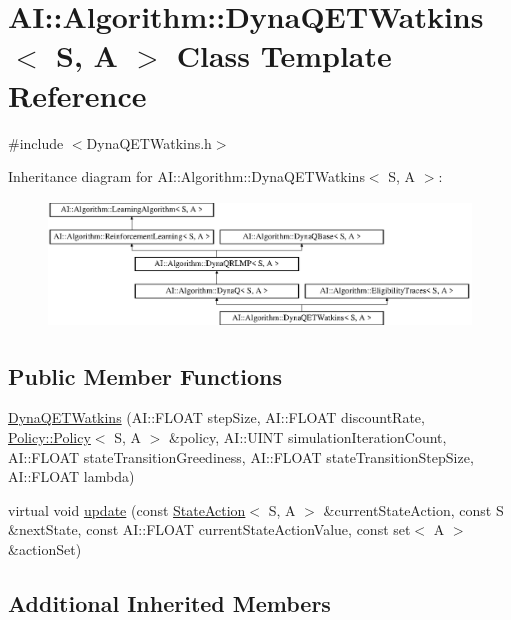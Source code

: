 \hypertarget{classAI_1_1Algorithm_1_1DynaQETWatkins}{\section{A\-I\-:\-:Algorithm\-:\-:Dyna\-Q\-E\-T\-Watkins$<$ S, A $>$ Class Template Reference}
\label{classAI_1_1Algorithm_1_1DynaQETWatkins}
}


{\ttfamily \#include $<$Dyna\-Q\-E\-T\-Watkins.\-h$>$}

Inheritance diagram for A\-I\-:\-:Algorithm\-:\-:Dyna\-Q\-E\-T\-Watkins$<$ S, A $>$\-:\begin{figure}[H]
\begin{center}
\leavevmode
\includegraphics[height=3.357314cm]{classAI_1_1Algorithm_1_1DynaQETWatkins}
\end{center}
\end{figure}
\subsection*{Public Member Functions}
\begin{DoxyCompactItemize}
\item 
\hyperlink{classAI_1_1Algorithm_1_1DynaQETWatkins_a0601ab5adb8ba7d0d94d93b6194528c9}{Dyna\-Q\-E\-T\-Watkins} (A\-I\-::\-F\-L\-O\-A\-T step\-Size, A\-I\-::\-F\-L\-O\-A\-T discount\-Rate, \hyperlink{classAI_1_1Algorithm_1_1Policy_1_1Policy}{Policy\-::\-Policy}$<$ S, A $>$ \&policy, A\-I\-::\-U\-I\-N\-T simulation\-Iteration\-Count, A\-I\-::\-F\-L\-O\-A\-T state\-Transition\-Greediness, A\-I\-::\-F\-L\-O\-A\-T state\-Transition\-Step\-Size, A\-I\-::\-F\-L\-O\-A\-T lambda)
\item 
virtual void \hyperlink{classAI_1_1Algorithm_1_1DynaQETWatkins_aa4e40af0fd705cd5d1f7fd13834c57c6}{update} (const \hyperlink{classAI_1_1StateAction}{State\-Action}$<$ S, A $>$ \&current\-State\-Action, const S \&next\-State, const A\-I\-::\-F\-L\-O\-A\-T current\-State\-Action\-Value, const set$<$ A $>$ \&action\-Set)
\end{DoxyCompactItemize}
\subsection*{Additional Inherited Members}


